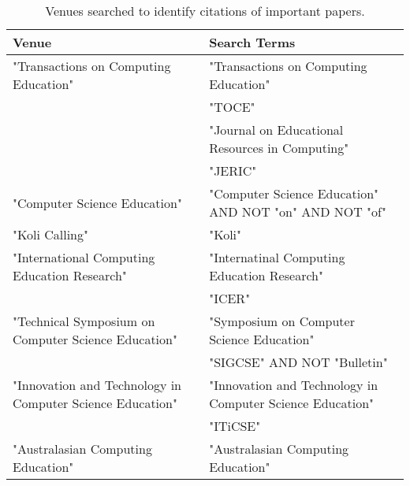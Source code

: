 \begin{table*}[t]
\begin{tabular}{ll}
Venue & Search Terms\\\hline
"Transactions on Computing Education" & "Transactions on Computing Education"\\
& "TOCE"\\
& "Journal on Educational Resources in Computing"\\
& "JERIC"\\
"Computer Science Education" & "Computer Science Education" AND NOT "on" AND NOT "of"\\
"Koli Calling" & "Koli"\\
"International Computing Education Research" & "Internatinal Computing Education Research"\\
& "ICER"\\
"Technical Symposium on Computer Science Education" & "Symposium on Computer Science Education"\\
& "SIGCSE" AND NOT "Bulletin"\\
"Innovation and Technology in Computer Science Education" & "Innovation and Technology in Computer Science Education"\\
& "ITiCSE"\\
"Australasian Computing Education" & "Australasian Computing Education"
\end{tabular}
\caption{Venues searched to identify citations of important papers.}
\end{table*}